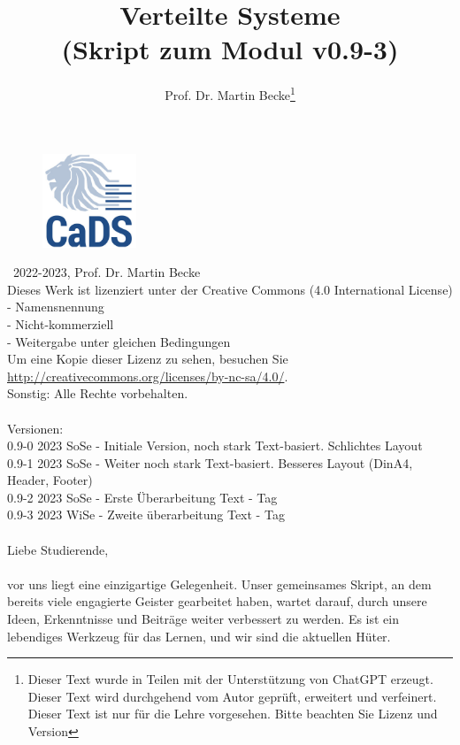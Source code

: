 \documentclass[a4paper]{article}
\title{Verteilte Systeme\\ (Skript zum Modul v0.9-3)}
\author{Prof. Dr. Martin Becke\footnote{Dieser Text wurde in Teilen mit der Unterstützung von ChatGPT erzeugt. Dieser Text{} wird durchgehend vom Autor geprüft, erweitert und verfeinert. Dieser Text ist nur für die Lehre vorgesehen. Bitte beachten Sie Lizenz und Version}}
\begin{document}
\maketitle
\vspace*{\fill} %
\begin{figure}[h]
  \centering
  \includegraphics[width=0.25\textwidth]{fig/graphics/CADS_Logo_Quadrat_300x300_RGB_72dpi.jpg} %
\end{figure}
\vspace*{\fill}

\newpage
\noindent
\textcopyright\ 2022-2023, Prof. Dr. Martin Becke\\
Dieses Werk ist lizenziert unter der Creative Commons (4.0 International License)\\
- Namensnennung\\ - Nicht-kommerziell\\ - Weitergabe unter gleichen Bedingungen \\Um eine Kopie dieser Lizenz zu sehen, besuchen Sie\\ \url{http://creativecommons.org/licenses/by-nc-sa/4.0/}.\\
Sonstig: Alle Rechte vorbehalten.
\noindent
\\\\
Versionen:\\
0.9-0 2023 SoSe - Initiale Version, noch stark Text-basiert. Schlichtes Layout\\
0.9-1 2023 SoSe - Weiter noch stark Text-basiert. Besseres Layout (DinA4, Header, Footer)\\ 
0.9-2 2023 SoSe - Erste Überarbeitung Text - Tag
\\
0.9-3 2023 WiSe - Zweite überarbeitung Text - Tag
\\\\
Liebe Studierende,\\\\ vor uns liegt eine einzigartige Gelegenheit. Unser gemeinsames Skript, an dem bereits viele engagierte Geister gearbeitet haben, wartet darauf, durch unsere Ideen, Erkenntnisse und Beiträge weiter verbessert zu werden. Es ist ein lebendiges Werkzeug für das Lernen, und wir sind die aktuellen Hüter.
\end{document}
